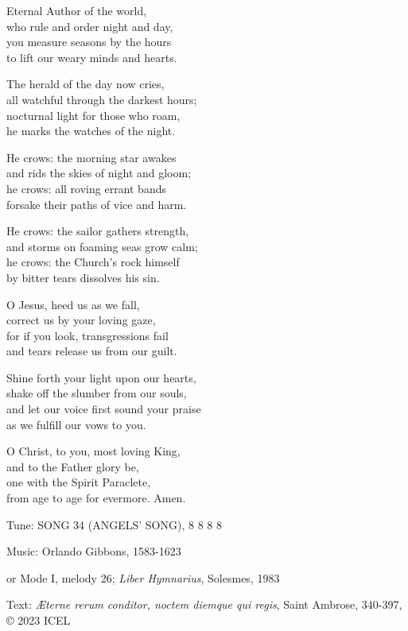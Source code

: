 \hymn


\begin{hymnverse}
Eternal Author of the world,\\
who rule and order night and day,\\
you measure seasons by the hours\\
to lift our weary minds and hearts.

The herald of the day now cries,\\
all watchful through the darkest hours;\\
nocturnal light for those who roam,\\
he marks the watches of the night.

He crows: the morning star awakes\\
and rids the skies of night and gloom;\\
he crows: all roving errant bands\\
forsake their paths of vice and harm.

He crows: the sailor gathers strength,\\
and storms on foaming seas grow calm;\\
he crows: the Church’s rock himself\\
by bitter tears dissolves his sin.

O Jesus, heed us as we fall,\\
correct us by your loving gaze,\\
for if you look, transgressions fail\\
and tears release us from our guilt.

Shine forth your light upon our hearts,\\
shake off the slumber from our souls,\\
and let our voice first sound your praise\\
as we fulfill our vows to you.

O Christ, to you, most loving King,\\
and to the Father glory be,\\
one with the Spirit Paraclete,\\
from age to age for evermore. Amen.
\end{hymnverse}

\begin{hymnsource}
Tune: SONG 34 (ANGELS’ SONG), 8 8 8 8

Music: Orlando Gibbons, 1583-1623

or Mode I, melody 26; \emph{Liber Hymnarius}, Solesmes, 1983

Text: \emph{Æterne rerum conditor, noctem diemque qui regis}, Saint Ambrose, 340-397, © 2023 ICEL
\end{hymnsource}
